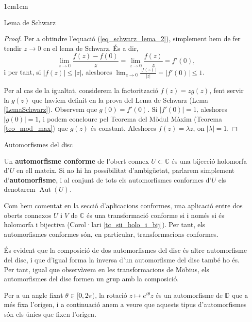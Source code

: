 \begin{adjustwidth}{1cm}{1cm}
\begin{subsection}{Lema de Schwarz}
\begin{proof}
    Per a obtindre l'equació (\ref{eq_schwarz_lema_2}), simplement hem de fer tendir $z\to 0$ en el lema de Schwarz. És a dir,
    \[
        \lim_{z\to 0} \frac{f(z)-f(0)}{z}=\lim_{z\to 0} \frac{f(z)}{z}=f'(0),
    \]
    i per tant, si $|f(z)|\leq|z|$, aleshores $\displaystyle \lim_{z\to 0} \frac{|f(z)|}{|z|}=|f'(0)|\leq 1$.
    
    
    Per al cas de la igualtat, considerem la factorització $f(z)=zg(z)$, fent servir la $g(z)$ que havíem definit en la prova del Lema de Schwarz (Lema \ref{LemaSchwarz}). Observem que $g(0)=f'(0)$. Si $|f'(0)|=1$, aleshores $|g(0)|=1$, i podem concloure pel Teorema del Mòdul Màxim (Teorema \ref{teo_mod_max}) que $g(z)$ és constant. Aleshores $f(z)=\lambda z$, on $|\lambda|=1$.
\end{proof}

\end{subsection}

\begin{subsection}{Automorfismes del disc}

\begin{definicio}
    Un \textbf{automorfisme conforme} de l'obert connex $U\subset \mathbb{C}$ és una bijecció holomorfa d'$U$ en ell mateix. Si no hi ha possibilitat d'ambigüetat, parlarem simplement d'\textbf{automorfisme}, i al conjunt de tots els automorfismes conformes d'$U$ els denotarem $\operatorname{Aut}(U)$.
\end{definicio}

\begin{nota}
    Com hem comentat en la secció d'aplicacions conformes, una aplicació entre dos oberts connexos $U$ i $V$ de $\mathbb{C}$ és una transformació conforme si i només si  és holomorfa i bijectiva (Corol·lari \ref{tc_sii_holo_i_bij}). Per tant, els automorfismes conformes són, en particular, transformacions conformes.
\end{nota}

És evident que la composició de dos automorfismes del disc és altre automorfisme del disc, i que d'igual forma la inversa d'un automorfisme del disc també ho és.
Per tant, igual que observàvem en les transformacions de Möbius, els automorfismes del disc formen un grup amb la composició.

\begin{exemple}
    Per a un angle fixat $\theta\in [0,2\pi)$, la rotació $z \mapsto e^{i\theta}z$ és un automorfisme de $\mathbb{\mathbb{D}}$ que a més fixa l'origen, i a continuació anem a veure que aquests tipus d'automorfismes són els únics que fixen l'origen.
\end{exemple}


\end{subsection}
\end{adjustwidth}
